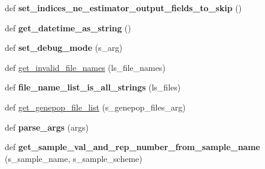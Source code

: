 \begin{DoxyCompactItemize}
\item 
def {\bfseries set\+\_\+indices\+\_\+ne\+\_\+estimator\+\_\+output\+\_\+fields\+\_\+to\+\_\+skip} ()\hypertarget{namespacenegui_1_1pgdriveneestimator_afd1338775d832ffc8d84cc10c6d1815b}{}\label{namespacenegui_1_1pgdriveneestimator_afd1338775d832ffc8d84cc10c6d1815b}

\item 
def {\bfseries get\+\_\+datetime\+\_\+as\+\_\+string} ()\hypertarget{namespacenegui_1_1pgdriveneestimator_a2d64d88a4d4f63a1f8e0c71606942690}{}\label{namespacenegui_1_1pgdriveneestimator_a2d64d88a4d4f63a1f8e0c71606942690}

\item 
def {\bfseries set\+\_\+debug\+\_\+mode} (s\+\_\+arg)\hypertarget{namespacenegui_1_1pgdriveneestimator_aa1b949a1baced8ac2725ae493f7216d8}{}\label{namespacenegui_1_1pgdriveneestimator_aa1b949a1baced8ac2725ae493f7216d8}

\item 
def \hyperlink{namespacenegui_1_1pgdriveneestimator_a944008262ae2ee7c6fc796499be626ce}{get\+\_\+invalid\+\_\+file\+\_\+names} (ls\+\_\+file\+\_\+names)
\item 
def {\bfseries file\+\_\+name\+\_\+list\+\_\+is\+\_\+all\+\_\+strings} (ls\+\_\+files)\hypertarget{namespacenegui_1_1pgdriveneestimator_a25129002805e932c87b657a083173863}{}\label{namespacenegui_1_1pgdriveneestimator_a25129002805e932c87b657a083173863}

\item 
def \hyperlink{namespacenegui_1_1pgdriveneestimator_a15b09d2967ec4812353b0e146f074799}{get\+\_\+genepop\+\_\+file\+\_\+list} (s\+\_\+genepop\+\_\+files\+\_\+arg)
\item 
def {\bfseries parse\+\_\+args} (args)\hypertarget{namespacenegui_1_1pgdriveneestimator_a3a0c075de2bc7a0d00b1893128b189c8}{}\label{namespacenegui_1_1pgdriveneestimator_a3a0c075de2bc7a0d00b1893128b189c8}

\item 
def {\bfseries get\+\_\+sample\+\_\+val\+\_\+and\+\_\+rep\+\_\+number\+\_\+from\+\_\+sample\+\_\+name} (s\+\_\+sample\+\_\+name, s\+\_\+sample\+\_\+scheme)\hypertarget{namespacenegui_1_1pgdriveneestimator_a3807e058c5f9e9e73eb6ecae5221853b}{}\label{namespacenegui_1_1pgdriveneestimator_a3807e058c5f9e9e73eb6ecae5221853b}


\end{DoxyCompactItemize}
